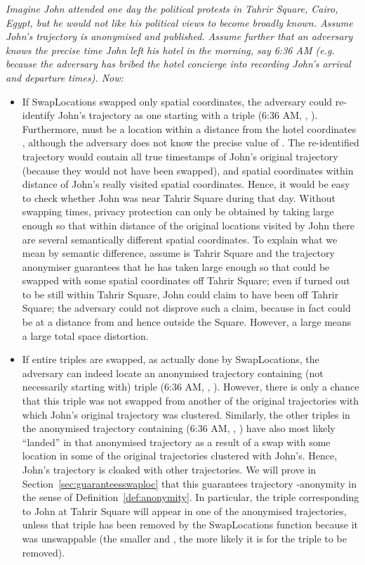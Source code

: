 \begin{example}\label{tahrir}{\em
Imagine John attended one day the political protests in Tahrir
Square, Cairo, Egypt, but he would not like his political
views to become broadly known.
Assume John's trajectory is anonymised
and published. Assume further that an adversary knows the precise time
John left his hotel in the morning, say 6:36 AM ({\em e.g.}
because the adversary has bribed the hotel concierge into recording
John's arrival and departure times). Now:
\begin{itemize}
\item If SwapLocations swapped only
spatial coordinates, the adversary could re-identify John's
trajectory as one starting with a triple (6:36 AM, , ).
Furthermore,  must be a location
within a distance  from the hotel coordinates ,
although the adversary does not know the precise value of .
The re-identified trajectory would contain all true timestamps
of John's original trajectory (because they would not have been swapped),
and spatial coordinates within distance  of John's really visited
spatial coordinates.
Hence, it would be easy to check whether John was near Tahrir
Square during that day. Without swapping times,
privacy protection can only be obtained by taking  large enough
so that within distance  of the original locations visited by John there
are several semantically different spatial coordinates.
To explain
what we mean by semantic difference, assume 
is Tahrir Square and the trajectory
anonymiser guarantees that he has taken  large enough
so that  could be swapped
with some spatial coordinates  off Tahrir Square;
even if  turned out to be still within Tahrir Square, John
could claim to have been off Tahrir Square; the adversary
could not disprove such a claim, because in fact
 could be at a distance  from  and hence
outside the Square.
However, a large  means a large total space distortion.
\item If entire triples are swapped, as actually done by SwapLocations,
the adversary can indeed locate an anonymised
trajectory containing
(not necessarily starting with) triple (6:36 AM, , ).
However, there is only a chance  that this triple was not swapped
from another of the  original trajectories with which John's
original trajectory was clustered.
Similarly, the other triples in the anonymised
trajectory containing (6:36 AM, , )
have also most likely ``landed'' in that anonymised trajectory as a result
of a swap with some location in some of the  original trajectories
clustered with John's. Hence, John's trajectory is cloaked with 
other trajectories. We will prove in
Section~\ref{sec:guaranteesswaploc} that
this guarantees trajectory -anonymity in the sense of
Definition~\ref{def:anonymity}. In particular, the triple 
corresponding to John at Tahrir Square will appear in one of the
 anonymised trajectories, unless that triple has been removed
by the SwapLocations function because it was unswappable (the smaller
 and , the more likely it is for the triple to be removed).
\end{itemize}}
\end{example}

